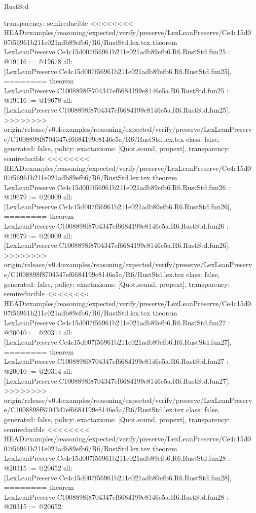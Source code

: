 \begin{lexlean}{RustStd}
\begin{coremodule}
{\begin{coremodule}
{{{{{{{{{{{{{{{{{{{{{{{{{{{{  transparency: semireducible
}
<<<<<<<< HEAD:examples/reasoning/expected/verify/preserve/LexLeanPreserve/Ce4c15d007f56961b211e021adb89efb6/R6/RustStd.lex.tex
theorem LexLeanPreserve.Ce4c15d007f56961b211e021adb89efb6.R6.RustStd.fun25 : @19116 := @19678 {
  all: [LexLeanPreserve.Ce4c15d007f56961b211e021adb89efb6.R6.RustStd.fun25],
========
theorem LexLeanPreserve.C1008898f8704347ef6684199e8146e5a.R6.RustStd.fun25 : @19116 := @19678 {
  all: [LexLeanPreserve.C1008898f8704347ef6684199e8146e5a.R6.RustStd.fun25],
>>>>>>>> origin/release/v0.4:examples/reasoning/expected/verify/preserve/LexLeanPreserve/C1008898f8704347ef6684199e8146e5a/R6/RustStd.lex.tex
  class: false,
  generated: false,
  policy: exact{axioms: [Quot.sound, propext]},
  transparency: semireducible
}
<<<<<<<< HEAD:examples/reasoning/expected/verify/preserve/LexLeanPreserve/Ce4c15d007f56961b211e021adb89efb6/R6/RustStd.lex.tex
theorem LexLeanPreserve.Ce4c15d007f56961b211e021adb89efb6.R6.RustStd.fun26 : @19679 := @20009 {
  all: [LexLeanPreserve.Ce4c15d007f56961b211e021adb89efb6.R6.RustStd.fun26],
========
theorem LexLeanPreserve.C1008898f8704347ef6684199e8146e5a.R6.RustStd.fun26 : @19679 := @20009 {
  all: [LexLeanPreserve.C1008898f8704347ef6684199e8146e5a.R6.RustStd.fun26],
>>>>>>>> origin/release/v0.4:examples/reasoning/expected/verify/preserve/LexLeanPreserve/C1008898f8704347ef6684199e8146e5a/R6/RustStd.lex.tex
  class: false,
  generated: false,
  policy: exact{axioms: [Quot.sound, propext]},
  transparency: semireducible
}
<<<<<<<< HEAD:examples/reasoning/expected/verify/preserve/LexLeanPreserve/Ce4c15d007f56961b211e021adb89efb6/R6/RustStd.lex.tex
theorem LexLeanPreserve.Ce4c15d007f56961b211e021adb89efb6.R6.RustStd.fun27 : @20010 := @20314 {
  all: [LexLeanPreserve.Ce4c15d007f56961b211e021adb89efb6.R6.RustStd.fun27],
========
theorem LexLeanPreserve.C1008898f8704347ef6684199e8146e5a.R6.RustStd.fun27 : @20010 := @20314 {
  all: [LexLeanPreserve.C1008898f8704347ef6684199e8146e5a.R6.RustStd.fun27],
>>>>>>>> origin/release/v0.4:examples/reasoning/expected/verify/preserve/LexLeanPreserve/C1008898f8704347ef6684199e8146e5a/R6/RustStd.lex.tex
  class: false,
  generated: false,
  policy: exact{axioms: [Quot.sound, propext]},
  transparency: semireducible
}
<<<<<<<< HEAD:examples/reasoning/expected/verify/preserve/LexLeanPreserve/Ce4c15d007f56961b211e021adb89efb6/R6/RustStd.lex.tex
theorem LexLeanPreserve.Ce4c15d007f56961b211e021adb89efb6.R6.RustStd.fun28 : @20315 := @20652 {
  all: [LexLeanPreserve.Ce4c15d007f56961b211e021adb89efb6.R6.RustStd.fun28],
========
theorem LexLeanPreserve.C1008898f8704347ef6684199e8146e5a.R6.RustStd.fun28 : @20315 := @20652 {
}}}}}}}}}}}}}}}}}}}}}}}}}}}}}}}}
\end{coremodule}}
\end{coremodule}
\end{lexlean}
